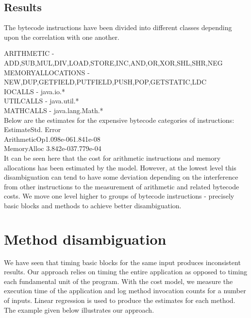\subsection{Results}
The bytecode instructions have been divided into different classes depending upon the correlation with one another.

ARITHMETIC         - ADD,SUB,MUL,DIV,LOAD,STORE,INC,AND,OR,XOR,SHL,SHR,NEG\\
MEMORYALLOCATIONS  - NEW,DUP,GETFIELD,PUTFIELD,PUSH,POP,GETSTATIC,LDC\\
IOCALLS            - java.io.*\\
UTILCALLS          - java.util.*\\
MATHCALLS          - java.lang.Math.*\\

Below are the estimates for the expensive bytecode categories of instructions:\\

\hspace{8em}Estimate\hspace{2em}Std. Error \\
ArithmeticOp\hspace{2em}1.098e-06\hspace{2em}1.841e-08  \\
MemoryAlloc \hspace{2em}3.842e-03\hspace{2em}7.779e-04 \\

It can be seen here that the cost for arithmetic instructions and memory allocations has been estimated by the model. However, at the lowest level this disambiguation can tend to have some deviation depending on the interference from other instructions to the measurement of arithmetic and related bytecode costs. We move one level higher to groups of bytecode instructions - precisely basic blocks and methods to achieve better disambiguation.\newline

\section{Method disambiguation}
We have seen that timing basic blocks for the same input produces inconsistent results. Our approach relies on timing the entire application as opposed to timing each fundamental unit of the program. With the cost model, we measure the execution time of the application and log method invocation counts for a number of inputs. Linear regression is used to produce the estimates for each method. The example given below illustrates our approach.

